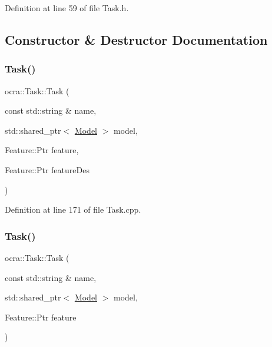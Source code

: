 Definition at line 59 of file Task.\+h.



\subsection{Constructor \& Destructor Documentation}
\hypertarget{classocra_1_1Task_abf071538753cbbc6af21f98644d978cc}{}\label{classocra_1_1Task_abf071538753cbbc6af21f98644d978cc} 
\subsubsection{\texorpdfstring{Task()}{Task()}\hspace{0.1cm}{\footnotesize\ttfamily [1/2]}}
{\footnotesize\ttfamily ocra\+::\+Task\+::\+Task (\begin{DoxyParamCaption}\item[{const std\+::string \&}]{name,  }\item[{std\+::shared\+\_\+ptr$<$ \hyperlink{classocra_1_1Model}{Model} $>$}]{model,  }\item[{Feature\+::\+Ptr}]{feature,  }\item[{Feature\+::\+Ptr}]{feature\+Des }\end{DoxyParamCaption})}



Definition at line 171 of file Task.\+cpp.

\hypertarget{classocra_1_1Task_ace0cba5936451a6423e8f341746adfd3}{}\label{classocra_1_1Task_ace0cba5936451a6423e8f341746adfd3} 
\subsubsection{\texorpdfstring{Task()}{Task()}\hspace{0.1cm}{\footnotesize\ttfamily [2/2]}}
{\footnotesize\ttfamily ocra\+::\+Task\+::\+Task (\begin{DoxyParamCaption}\item[{const std\+::string \&}]{name,  }\item[{std\+::shared\+\_\+ptr$<$ \hyperlink{classocra_1_1Model}{Model} $>$}]{model,  }\item[{Feature\+::\+Ptr}]{feature }\end{DoxyParamCaption})}




